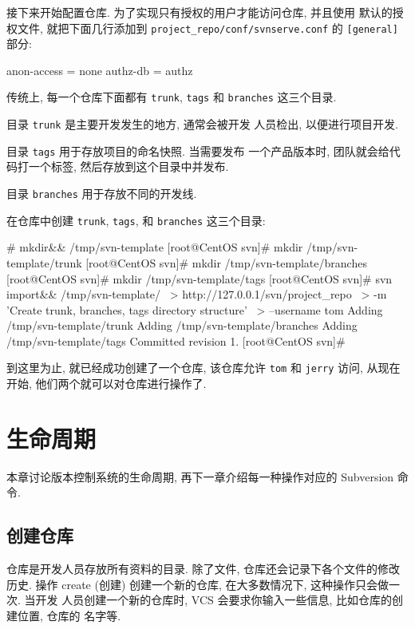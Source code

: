 \documentclass[nofonts, oneside]{ctexart}
\newcommand\svn{\texttt{svn}}
\newcommand\svnim{\texttt{import}}
\begin{document}
接下来开始配置仓库. 为了实现只有授权的用户才能访问仓库, 并且使用
默认的授权文件, 就把下面几行添加到
\texttt{project\_repo/conf/svnserve.conf}
的 \texttt{[general]} 部分:
\begin{svnshell}
anon-access = none
authz-db = authz
\end{svnshell}

传统上, 每一个仓库下面都有 \texttt{trunk}, \texttt{tags} 和 \texttt{branches}
这三个目录.

目录 \texttt{trunk} 是主要开发发生的地方, 通常会被开发
人员检出, 以便进行项目开发.

目录 \texttt{tags} 用于存放项目的命名快照. 当需要发布
一个产品版本时, 团队就会给代码打一个标签, 然后存放到这个目录中并发布.

目录 \texttt{branches} 用于存放不同的开发线.

在仓库中创建 \texttt{trunk}, \texttt{tags}, 和 \texttt{branches}
这三个目录:
\begin{svnshell}
# mkdir&& /tmp/svn-template
[root@CentOS svn]# mkdir /tmp/svn-template/trunk
[root@CentOS svn]# mkdir /tmp/svn-template/branches
[root@CentOS svn]# mkdir /tmp/svn-template/tags
[root@CentOS svn]# svn import&\index{svn@\svn!import@\svnim}& /tmp/svn-template/ \
> http://127.0.0.1/svn/project_repo \
> -m 'Create trunk, branches, tags directory structure' \
> --username tom
Adding              /tmp/svn-template/trunk
Adding              /tmp/svn-template/branches
Adding              /tmp/svn-template/tags
Committed revision 1.
[root@CentOS svn]#
\end{svnshell}

到这里为止, 就已经成功创建了一个仓库, 该仓库允许 \texttt{tom} 和
\texttt{jerry} 访问, 从现在开始, 他们两个就可以对仓库进行操作了.

\section{生命周期}
\label{sec:life_cycle}

本章讨论版本控制系统的生命周期, 再下一章介绍每一种操作对应的 Subversion 命令.

\subsection{创建仓库}
\label{subsec:create_repository}

仓库是开发人员存放所有资料的目录. 除了文件, 仓库还会记录下各个文件的修改历史.
操作 create (创建) 创建一个新的仓库, 在大多数情况下, 这种操作只会做一次. 当开发
人员创建一个新的仓库时, VCS 会要求你输入一些信息, 比如仓库的创建位置, 仓库的
名字等.
\end{document}
